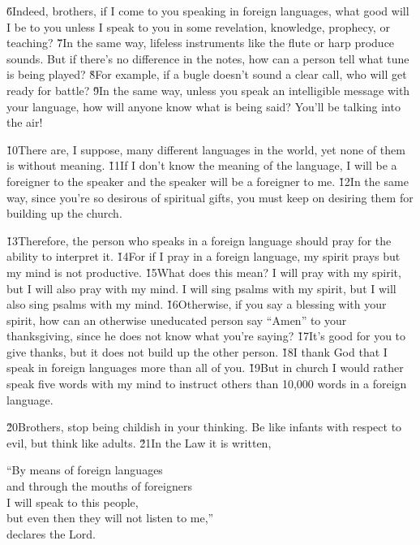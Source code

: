 \v{6}Indeed, brothers, if I come to you speaking in foreign languages, what good will I be to you unless I speak to you in some revelation, knowledge, prophecy, or teaching? \v{7}In the same way, lifeless instruments like the flute or harp produce sounds. But if there's no difference in the notes, how can a person tell what tune is being played? \v{8}For example, if a bugle doesn't sound a clear call, who will get ready for battle? \v{9}In the same way, unless you speak an intelligible message with your language, how will anyone know what is being said? You'll be talking into the air!

\v{10}There are, I suppose, many different languages in the world, yet none of them is without meaning. \v{11}If I don't know the meaning of the language, I will be a foreigner to the speaker and the speaker will be a foreigner to me. \v{12}In the same way, since you're so desirous of spiritual gifts, you must keep on desiring them for building up the church.

\v{13}Therefore, the person who speaks in a foreign language should pray for the ability to interpret it. \v{14}For if I pray in a foreign language, my spirit prays but my mind is not productive. \v{15}What does this mean? I will pray with my spirit, but I will also pray with my mind. I will sing psalms with my spirit, but I will also sing psalms with my mind. \v{16}Otherwise, if you say a blessing with your spirit, how can an otherwise uneducated person say ``Amen'' to your thanksgiving, since he does not know what you're saying? \v{17}It's good for you to give thanks, but it does not build up the other person. \v{18}I thank God that I speak in foreign languages more than all of you. \v{19}But in church I would rather speak five words with my mind to instruct others than 10,000 words in a foreign language.

\v{20}Brothers, stop being childish in your thinking. Be like infants with respect to evil, but think like adults. \v{21}In the Law it is written,

\begin{poetry}
\poeml ``By means of foreign languages \\
\poemll    and through the mouths of foreigners \\
\poeml I will speak to this people, \\
\poemll    but even then they will not listen to me,'' \\
\poemlll       declares the Lord.
\end{poetry}

